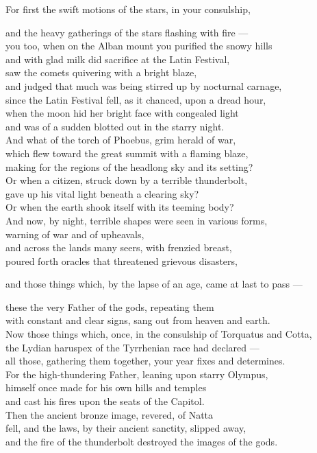 For first the swift motions of the stars, in your consulship,

and the heavy gatherings of the stars flashing with fire — \\
you too, when on the Alban mount you purified the snowy hills \\
and with glad milk did sacrifice at the Latin Festival, \\
saw the comets quivering with a bright blaze, \\
and judged that much was being stirred up by nocturnal carnage, \\
since the Latin Festival fell, as it chanced, upon a dread hour, \\
when the moon hid her bright face with congealed light \\
and was of a sudden blotted out in the starry night. \\
And what of the torch of Phoebus, grim herald of war, \\
which flew toward the great summit with a flaming blaze, \\
making for the regions of the headlong sky and its setting? \\
Or when a citizen, struck down by a terrible thunderbolt, \\
gave up his vital light beneath a clearing sky? \\
Or when the earth shook itself with its teeming body? \\
And now, by night, terrible shapes were seen in various forms, \\
warning of war and of upheavals, \\
and across the lands many seers, with frenzied breast, \\
poured forth oracles that threatened grievous disasters,

 and those things which, by the lapse of an age, came at last to pass —

these the very Father of the gods, repeating them \\
with constant and clear signs, sang out from heaven and earth. \\
Now those things which, once, in the consulship of Torquatus and Cotta, \\
the Lydian haruspex of the Tyrrhenian race had declared — \\
all those, gathering them together, your year fixes and determines. \\
For the high-thundering Father, leaning upon starry Olympus, \\
himself once made for his own hills and temples \\
and cast his fires upon the seats of the Capitol. \\
Then the ancient bronze image, revered, of Natta \\
fell, and the laws, by their ancient sanctity, slipped away, \\
and the fire of the thunderbolt destroyed the images of the gods.

